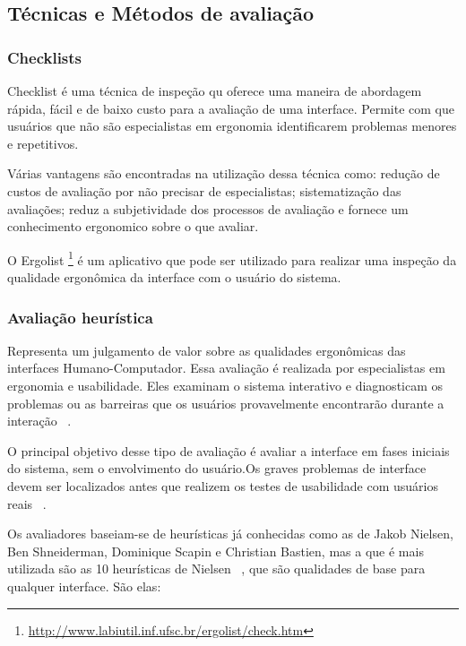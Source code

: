 \subsection{Técnicas e Métodos de avaliação}


\subsubsection{Checklists}

	Checklist é uma técnica de inspeção qu oferece uma maneira de abordagem rápida, fácil e de baixo custo para a avaliação de uma interface. Permite com que usuários que não são especialistas em ergonomia identificarem problemas menores e repetitivos.~\cite{cybis2010} %

	Várias vantagens são encontradas na utilização dessa técnica como: redução de custos de avaliação por não precisar de especialistas; sistematização das avaliações; reduz a subjetividade dos processos de avaliação e fornece um conhecimento ergonomico sobre o que avaliar.

	O Ergolist \footnote{\url{http://www.labiutil.inf.ufsc.br/ergolist/check.htm}} é um aplicativo que pode ser utilizado para realizar uma inspeção da qualidade ergonômica da interface com o usuário do sistema.

\subsubsection{Avaliação heurística}

	Representa um julgamento de valor sobre as qualidades ergonômicas das interfaces Humano-Computador. Essa avaliação é realizada por especialistas em ergonomia e usabilidade. Eles examinam o sistema interativo e diagnosticam os problemas ou as barreiras que os usuários provavelmente encontrarão durante a interação ~\cite{cybis2010}.

	O principal objetivo desse tipo de avaliação é avaliar a interface em fases iniciais do sistema, sem o envolvimento do usuário.Os graves problemas de interface devem ser localizados antes que realizem os testes de usabilidade com usuários reais ~\cite{santos2012}.

	Os avaliadores baseiam-se de heurísticas já conhecidas como as de Jakob Nielsen, Ben Shneiderman, Dominique Scapin e Christian Bastien, mas a que é mais utilizada são as 10 heurísticas de Nielsen ~, que são qualidades de base para qualquer interface. São elas:

